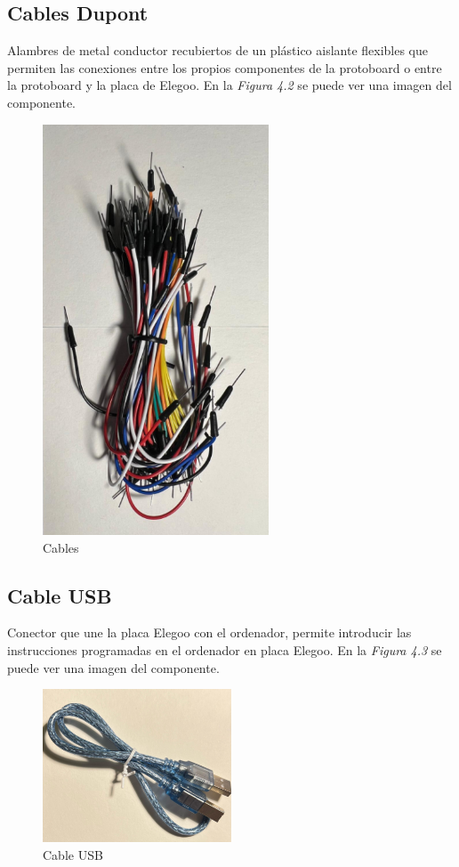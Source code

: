 \subsection{Cables Dupont}
Alambres de metal conductor recubiertos de un plástico aislante flexibles que permiten las conexiones entre los propios componentes de la protoboard o entre la protoboard y la placa de Elegoo. En la \textit{Figura 4.2} se puede ver una imagen del componente.
\begin{figure}[h]
        \centering
        \includegraphics[angle=90,width=0.6\textwidth]{img/cable_dupont.png}
        \caption{Cables}
        \label{fig:activforce}
    \end{figure}
   
\subsection{Cable USB}
Conector que une la placa Elegoo con el ordenador, permite introducir las instrucciones programadas en el ordenador en placa Elegoo. En la \textit{Figura 4.3} se puede ver una imagen del componente.
\begin{figure}[h]
        \centering
        \includegraphics[width=0.5\textwidth]{img/cable usb.png}
        \caption{Cable USB}
        \label{fig:activforce}
    \end{figure}
   
